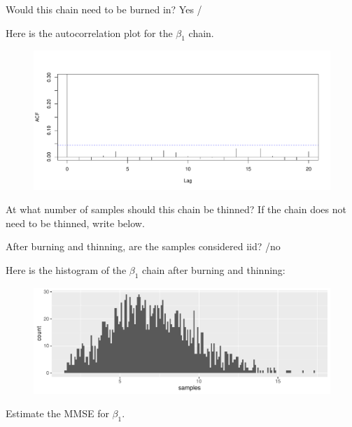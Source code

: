 \documentclass[12pt]{article}
\begin{document}
\begin{enumerate}
 Would this chain need to be burned in? Yes /  
\pagebreak

Here is the autocorrelation plot for the $\beta_1$ chain.

\vspace{-0.5cm}
\begin{figure}[htp]
\centering
\includegraphics[width=6in]{beta_1_acf}
\end{figure}
\vspace{-0.5cm}

 At what number of samples should this chain be thinned? If the chain does not need to be thinned, write  below.\\


 After burning and thinning, are the samples considered iid? /no 

Here is the histogram of the $\beta_1$ chain after burning and thinning:

\begin{figure}[htp]
\centering
\includegraphics[width=6in]{beta_1_posterior}
\end{figure}

 Estimate the MMSE for $\beta_1$.\\

\pagebreak


\end{enumerate}
\end{document}
